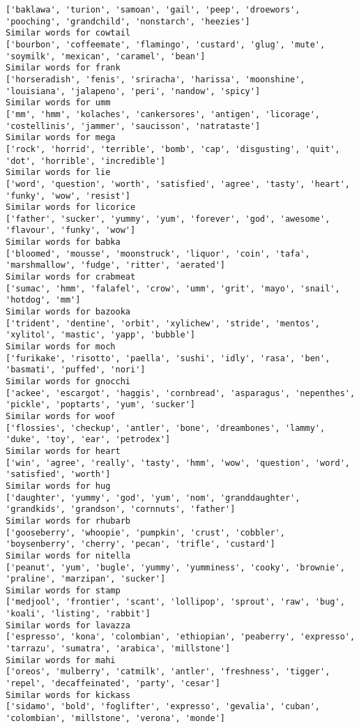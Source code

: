 \documentclass[11pt]{article}
\begin{document}
\begin{Verbatim}[commandchars=\\\{\}]
['baklawa', 'turion', 'samoan', 'gail', 'peep', 'droewors', 'pooching', 'grandchild', 'nonstarch', 'heezies']
Similar words for cowtail
['bourbon', 'coffeemate', 'flamingo', 'custard', 'glug', 'mute', 'soymilk', 'mexican', 'caramel', 'bean']
Similar words for frank
['horseradish', 'fenis', 'sriracha', 'harissa', 'moonshine', 'louisiana', 'jalapeno', 'peri', 'nandow', 'spicy']
Similar words for umm
['mm', 'hmm', 'kolaches', 'cankersores', 'antigen', 'licorage', 'costellinis', 'jammer', 'saucisson', 'natrataste']
Similar words for mega
['rock', 'horrid', 'terrible', 'bomb', 'cap', 'disgusting', 'quit', 'dot', 'horrible', 'incredible']
Similar words for lie
['word', 'question', 'worth', 'satisfied', 'agree', 'tasty', 'heart', 'funky', 'wow', 'resist']
Similar words for licorice
['father', 'sucker', 'yummy', 'yum', 'forever', 'god', 'awesome', 'flavour', 'funky', 'wow']
Similar words for babka
['bloomed', 'mousse', 'moonstruck', 'liquor', 'coin', 'tafa', 'marshmallow', 'fudge', 'ritter', 'aerated']
Similar words for crabmeat
['sumac', 'hmm', 'falafel', 'crow', 'umm', 'grit', 'mayo', 'snail', 'hotdog', 'mm']
Similar words for bazooka
['trident', 'dentine', 'orbit', 'xylichew', 'stride', 'mentos', 'xylitol', 'mastic', 'yapp', 'bubble']
Similar words for moch
['furikake', 'risotto', 'paella', 'sushi', 'idly', 'rasa', 'ben', 'basmati', 'puffed', 'nori']
Similar words for gnocchi
['ackee', 'escargot', 'haggis', 'cornbread', 'asparagus', 'nepenthes', 'pickle', 'poptarts', 'yum', 'sucker']
Similar words for woof
['flossies', 'checkup', 'antler', 'bone', 'dreambones', 'lammy', 'duke', 'toy', 'ear', 'petrodex']
Similar words for heart
['win', 'agree', 'really', 'tasty', 'hmm', 'wow', 'question', 'word', 'satisfied', 'worth']
Similar words for hug
['daughter', 'yummy', 'god', 'yum', 'nom', 'granddaughter', 'grandkids', 'grandson', 'cornnuts', 'father']
Similar words for rhubarb
['gooseberry', 'whoopie', 'pumpkin', 'crust', 'cobbler', 'boysenberry', 'cherry', 'pecan', 'trifle', 'custard']
Similar words for nitella
['peanut', 'yum', 'bugle', 'yummy', 'yumminess', 'cooky', 'brownie', 'praline', 'marzipan', 'sucker']
Similar words for stamp
['medjool', 'frontier', 'scant', 'lollipop', 'sprout', 'raw', 'bug', 'koali', 'listing', 'rabbit']
Similar words for lavazza
['espresso', 'kona', 'colombian', 'ethiopian', 'peaberry', 'expresso', 'tarrazu', 'sumatra', 'arabica', 'millstone']
Similar words for mahi
['oreos', 'mulberry', 'catmilk', 'antler', 'freshness', 'tigger', 'repel', 'decaffeinated', 'party', 'cesar']
Similar words for kickass
['sidamo', 'bold', 'foglifter', 'expresso', 'gevalia', 'cuban', 'colombian', 'millstone', 'verona', 'monde']

\end{Verbatim}
\end{document}
